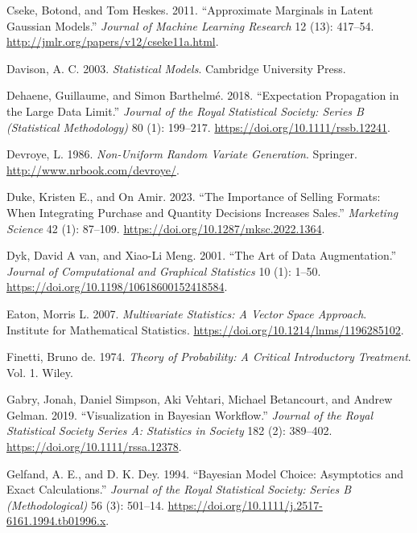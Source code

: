 \documentclass[
  11pt,
  letterpaper,
]{scrbook}
\newlength{\cslhangindent}
\newenvironment{CSLReferences}[2] %
 {\begin{list}{}{%
  \setlength{\itemindent}{0pt}
  \setlength{\leftmargin}{0pt}
  \setlength{\parsep}{0pt}
  \ifodd #1
   \setlength{\leftmargin}{\cslhangindent}
   \setlength{\itemindent}{-1\cslhangindent}
  \fi
  \setlength{\itemsep}{#2\baselineskip}}}
 {\end{list}}
\theoremstyle{definition}
\theoremstyle{plain}
\theoremstyle{plain}
\theoremstyle{plain}
\theoremstyle{definition}
\theoremstyle{definition}
\theoremstyle{plain}
\theoremstyle{plain}
\theoremstyle{remark}
\begin{document}
\begin{CSLReferences}{1}{1}
Cseke, Botond, and Tom Heskes. 2011. {``Approximate Marginals in Latent
{G}aussian Models.''} \emph{Journal of Machine Learning Research} 12
(13): 417--54. \url{http://jmlr.org/papers/v12/cseke11a.html}.

Davison, A. C. 2003. \emph{Statistical Models}. Cambridge University
Press.

Dehaene, Guillaume, and Simon Barthelmé. 2018. {``Expectation
Propagation in the Large Data Limit.''} \emph{Journal of the Royal
Statistical Society: Series B (Statistical Methodology)} 80 (1):
199--217. \url{https://doi.org/10.1111/rssb.12241}.

Devroye, L. 1986. \emph{Non-Uniform Random Variate Generation}.
Springer. \url{http://www.nrbook.com/devroye/}.

Duke, Kristen E., and On Amir. 2023. {``The Importance of Selling
Formats: When Integrating Purchase and Quantity Decisions Increases
Sales.''} \emph{Marketing Science} 42 (1): 87--109.
\url{https://doi.org/10.1287/mksc.2022.1364}.

Dyk, David A van, and Xiao-Li Meng. 2001. {``The Art of Data
Augmentation.''} \emph{Journal of Computational and Graphical
Statistics} 10 (1): 1--50.
\url{https://doi.org/10.1198/10618600152418584}.

Eaton, Morris L. 2007. \emph{Multivariate Statistics: A Vector Space
Approach}. Institute for Mathematical Statistics.
\url{https://doi.org/10.1214/lnms/1196285102}.

Finetti, Bruno de. 1974. \emph{Theory of Probability: A Critical
Introductory Treatment}. Vol. 1. Wiley.

Gabry, Jonah, Daniel Simpson, Aki Vehtari, Michael Betancourt, and
Andrew Gelman. 2019. {``{Visualization in {B}ayesian Workflow}.''}
\emph{Journal of the Royal Statistical Society Series A: Statistics in
Society} 182 (2): 389--402. \url{https://doi.org/10.1111/rssa.12378}.

Gelfand, A. E., and D. K. Dey. 1994. {``Bayesian Model Choice:
Asymptotics and Exact Calculations.''} \emph{Journal of the Royal
Statistical Society: Series B (Methodological)} 56 (3): 501--14.
\url{https://doi.org/10.1111/j.2517-6161.1994.tb01996.x}.


\end{CSLReferences}
\end{document}
